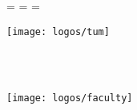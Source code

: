 \begin{titlepage}
  \oddsidemargin=\evensidemargin\relax
  \textwidth=\dimexpr{}\evensidemargin-2in\relax
  \hsize=\textwidth\relax

  \centering

  \vspace{0mm}
  \texttt{[image: logos/tum]}

  \vspace{10mm}
  {\huge\MakeUppercase{\getFaculty{}}}\\
  {\large\MakeUppercase{\getUniversity{}}}\\

  \vspace{40mm}
  {\Large \getDoctype{}}

  \vspace{30mm}
  {\huge\bfseries \getTitle{}}

  \vspace{30mm}
  {\LARGE \getAuthor{}}

  \vspace{30mm}
  \texttt{[image: logos/faculty]}
\end{titlepage}
